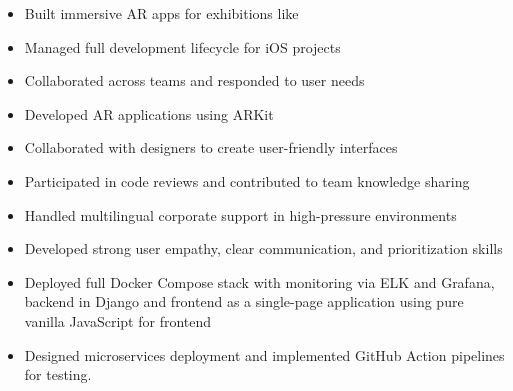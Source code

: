 \documentclass[10pt,a4paper,withhyper]{altacv}
\begin{document}
\begin{paracol}{2}



\begin{itemize}
\item Built immersive AR apps for exhibitions like 
\item Managed full development lifecycle for iOS projects
\item Collaborated across teams and responded to user needs
\end{itemize}
\divider

\begin{itemize}
\item Developed AR applications using ARKit
\item Collaborated with designers to create user-friendly interfaces
\item Participated in code reviews and contributed to team knowledge sharing
\end{itemize}
\divider

\begin{itemize}
\item Handled multilingual corporate support in high-pressure environments
\item Developed strong user empathy, clear communication, and prioritization skills
\end{itemize}

\divider


\begin{itemize}
  \item Deployed full Docker Compose stack with monitoring via ELK and Grafana, backend in Django and frontend as a single-page application using pure vanilla JavaScript for frontend
  \item Designed microservices deployment and implemented GitHub Action pipelines for testing.
\end{itemize}


\end{paracol}
\end{document}
